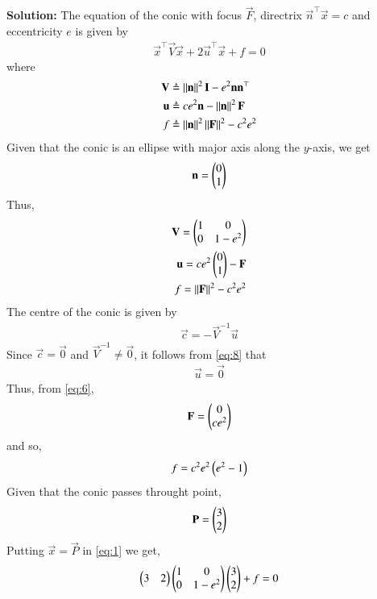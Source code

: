 \documentclass[journal,12pt,twocolumn]{IEEEtran}
\begin{document}
\begin{enumerate}
\textbf{Solution:}
The equation of the conic with focus $\vec{F}$, directrix $\vec{n}^\top\vec{x} = c$ and eccentricity $e$ is given by
\begin{align}
\vec{x}^\top\vec{V}\vec{x} + 2\vec{u}^\top\vec{x} + f = 0
\label{eq:1}
\end{align}
where
\begin{align}
\mathbf{V} &\triangleq \left\lVert\mathbf{n}\right\rVert^2\mathbf{I} - e^2\mathbf{n}\mathbf{n}^\top \label{eq:2} \\
\mathbf{u} &\triangleq ce^2\mathbf{n} - \left\lVert\mathbf{n}\right\rVert^2\mathbf{F} \label{eq:3} \\
f &\triangleq \left\lVert\mathbf{n}\right\rVert^2\left\lVert\mathbf{F}\right\rVert^2 - c^2e^2 \label{eq:4}
\end{align}
Given that the conic is an ellipse with major axis along the $y$-axis, we get
\begin{align}
\mathbf{n} = \begin{pmatrix}0\\1\end{pmatrix}
\end{align}
Thus,
\begin{align}
\mathbf{V} = \begin{pmatrix}1&0\\0&1-e^2\end{pmatrix} \label{eq:5} \\
\mathbf{u} = ce^2\begin{pmatrix}0\\1\end{pmatrix} - \mathbf{F} \label{eq:6} \\
f = \left\lVert\mathbf{F}\right\rVert^2 - c^2e^2 \label{eq:7}
\end{align}
The centre of the conic is given by
\begin{align}
\vec{c} = -\vec{V}^{-1}\vec{u}
\label{eq:8}
\end{align}
Since $\vec{c} = \vec{0}$ and $\vec{V}^{-1} \neq \vec{0}$, it follows from \eqref{eq:8} that 
\begin{align}
\vec{u} = \vec{0}
\end{align}
Thus, from \eqref{eq:6},
\begin{align}
\mathbf{F} = \begin{pmatrix}0\\ce^2\end{pmatrix}
\label{eq:9}
\end{align}
and so,
\begin{align}
f = c^2e^2\left(e^2-1\right)
\label{eq:9}
\end{align}
Given that the conic passes throught point,
\begin{align}
\mathbf{P} = \begin{pmatrix}3\\2\end{pmatrix} 
\end{align}
Putting $\vec{x} = \vec{P}$ in \eqref{eq:1} we get,
\begin{align}
\myvec{3&2}\myvec{1&0\\0&1-e^2}\myvec{3\\2} + f &= 0 \\

\end{align}
\end{enumerate}
\end{document}
